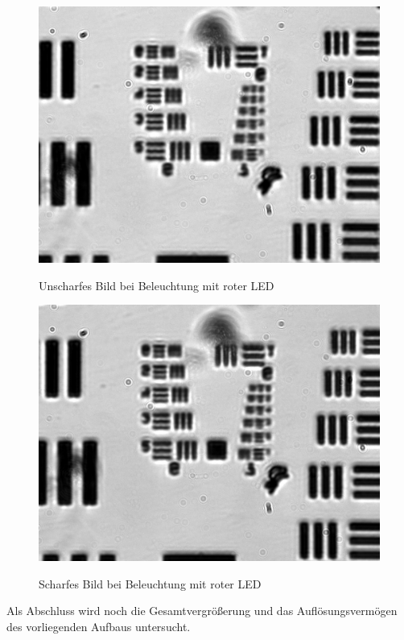 \documentclass[english, ngerman]{scrartcl}
\begin{document}
\begin{figure}[H]
    \begin{minipage}[t]{0.475\linewidth}
        \centering
        \includegraphics[width=\linewidth]{fig/Versuch3/hellfeld_3.3_rot_unscharf.jpg}
        \caption[Hellfeld LED rot unscharf]{Unscharfes Bild bei Beleuchtung mit roter LED}
        \label{fig:Hellfeld_3_3_rot_unscharf}
        \includegraphics[width=\linewidth]{fig/Versuch3/hellfeld_3.3_rot_scharf.jpg}
        \caption[Hellfeld LED rot scharf]{Scharfes Bild bei Beleuchtung mit roter LED}
        \label{fig:Hellfeld_3_3_rot_scharf}
    \end{minipage}
\end{figure}
\setcaphanging

Als Abschluss wird noch die Gesamtvergrößerung und das Auflösungsvermögen des vorliegenden Aufbaus untersucht.
\end{document}
